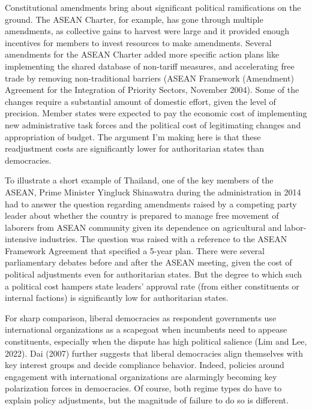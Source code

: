 \documentclass[12pt]{article}
\begin{document}
Constitutional amendments bring about significant political ramifications on the ground. The ASEAN Charter, for example, has gone through multiple amendments, as collective gains to harvest were large and it provided enough incentives for members to invest resources to make amendments. Several amendments for the ASEAN Charter added more specific action plans like implementing the shared database of non-tariff measures, and accelerating free trade by removing non-traditional barriers (ASEAN Framework (Amendment) Agreement for the Integration of Priority Sectors, November 2004). Some of the changes require a substantial amount of domestic effort, given the level of precision. Member states were expected to pay the economic cost of implementing new administrative task forces and the political cost of legitimating changes and appropriation of budget. The argument I’m making here is that these readjustment costs are significantly lower for authoritarian states than democracies. 

To illustrate a short example of Thailand, one of the key members of the ASEAN, Prime Minister Yingluck Shinawatra during the administration in 2014 had to answer the question regarding amendments raised by a competing party leader about whether the country is prepared to manage free movement of laborers from ASEAN community given its dependence on agricultural and labor-intensive industries. The question was raised with a reference to the ASEAN Framework Agreement that specified a 5-year plan. There were several parliamentary debates before and after the ASEAN meeting, given the cost of political adjustments even for authoritarian states. But the degree to which such a political cost hampers state leaders’ approval rate (from either constituents or internal factions) is significantly low for  authoritarian states. 

For sharp comparison, liberal democracies as respondent governments use international organizations as a scapegoat when incumbents need to appease constituents, especially when the dispute has high political salience (Lim and Lee, 2022). Dai (2007) further suggests that liberal democracies align themselves with key interest groups and decide compliance behavior. Indeed, policies around engagement with international organizations are alarmingly becoming key polarization forces in democracies. Of course, both regime types do have to explain policy adjustments, but the magnitude of failure to do so is different. 
\end{document}
